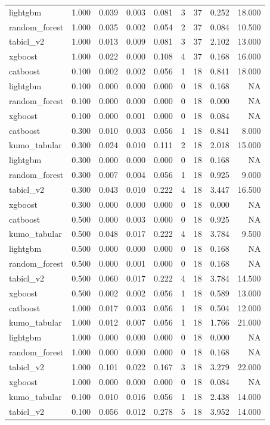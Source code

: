 \begin{table}
\begin{tabular}{lrrrrrrrr}
lightgbm & 1.000 & 0.039 & 0.003 & 0.081 & 3 & 37 & 0.252 & 18.000 \\
random\_forest & 1.000 & 0.035 & 0.002 & 0.054 & 2 & 37 & 0.084 & 10.500 \\
tabicl\_v2 & 1.000 & 0.013 & 0.009 & 0.081 & 3 & 37 & 2.102 & 13.000 \\
xgboost & 1.000 & 0.022 & 0.000 & 0.108 & 4 & 37 & 0.168 & 16.000 \\
catboost & 0.100 & 0.002 & 0.002 & 0.056 & 1 & 18 & 0.841 & 18.000 \\
lightgbm & 0.100 & 0.000 & 0.000 & 0.000 & 0 & 18 & 0.168 & NA \\
random\_forest & 0.100 & 0.000 & 0.000 & 0.000 & 0 & 18 & 0.000 & NA \\
xgboost & 0.100 & 0.000 & 0.001 & 0.000 & 0 & 18 & 0.084 & NA \\
catboost & 0.300 & 0.010 & 0.003 & 0.056 & 1 & 18 & 0.841 & 8.000 \\
kumo\_tabular & 0.300 & 0.024 & 0.010 & 0.111 & 2 & 18 & 2.018 & 15.000 \\
lightgbm & 0.300 & 0.000 & 0.000 & 0.000 & 0 & 18 & 0.168 & NA \\
random\_forest & 0.300 & 0.007 & 0.004 & 0.056 & 1 & 18 & 0.925 & 9.000 \\
tabicl\_v2 & 0.300 & 0.043 & 0.010 & 0.222 & 4 & 18 & 3.447 & 16.500 \\
xgboost & 0.300 & 0.000 & 0.000 & 0.000 & 0 & 18 & 0.000 & NA \\
catboost & 0.500 & 0.000 & 0.003 & 0.000 & 0 & 18 & 0.925 & NA \\
kumo\_tabular & 0.500 & 0.048 & 0.017 & 0.222 & 4 & 18 & 3.784 & 9.500 \\
lightgbm & 0.500 & 0.000 & 0.000 & 0.000 & 0 & 18 & 0.168 & NA \\
random\_forest & 0.500 & 0.000 & 0.001 & 0.000 & 0 & 18 & 0.168 & NA \\
tabicl\_v2 & 0.500 & 0.060 & 0.017 & 0.222 & 4 & 18 & 3.784 & 14.500 \\
xgboost & 0.500 & 0.002 & 0.002 & 0.056 & 1 & 18 & 0.589 & 13.000 \\
catboost & 1.000 & 0.017 & 0.003 & 0.056 & 1 & 18 & 0.504 & 12.000 \\
kumo\_tabular & 1.000 & 0.012 & 0.007 & 0.056 & 1 & 18 & 1.766 & 21.000 \\
lightgbm & 1.000 & 0.000 & 0.000 & 0.000 & 0 & 18 & 0.000 & NA \\
random\_forest & 1.000 & 0.000 & 0.000 & 0.000 & 0 & 18 & 0.168 & NA \\
tabicl\_v2 & 1.000 & 0.101 & 0.022 & 0.167 & 3 & 18 & 3.279 & 22.000 \\
xgboost & 1.000 & 0.000 & 0.000 & 0.000 & 0 & 18 & 0.084 & NA \\
kumo\_tabular & 0.100 & 0.010 & 0.016 & 0.056 & 1 & 18 & 2.438 & 14.000 \\
tabicl\_v2 & 0.100 & 0.056 & 0.012 & 0.278 & 5 & 18 & 3.952 & 14.000 \\
\bottomrule
\end{tabular}
\end{table}
